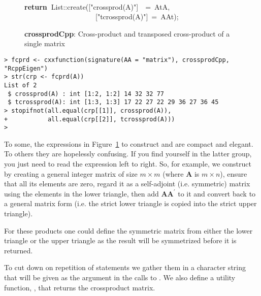 \documentclass[shortnames,article]{jss}
\newcommand{\hlstd}[1]{\textcolor[rgb]{0,0,0}{#1}}
\newcommand{\hlopt}[1]{\textcolor[rgb]{0,0,0}{#1}}
\newcommand{\hlstr}[1]{\textcolor[rgb]{0.90,0.15,0.15}{#1}}
\newcommand{\hlkwa}[1]{\textcolor[rgb]{0.61,0.13,0.93}{\bf{#1}}}
\newcommand{\hlkwd}[1]{\textcolor[rgb]{0,0,0}{#1}}
\begin{document}
\begin{figure}[htb]
    \hlstd{}\hspace*{\fill}\\
    \hlkwa{return\ }\hlstd{List}\hlopt{::}\hlstd{}\hlkwd{create}\hlstd{}\hlopt{(}\hlstd{\textunderscore }\hlopt{{[}}\hlstd{}\hlstr{"crossprod(A)"}\hlstd{}\hlopt{{]}}\hlstd{\ \ }\hlopt{=\ }\hlstd{AtA}\hlopt{,}\hspace*{\fill}\\
    \hlstd{}\hlstd{\ \ \ \ \ \ \ \ \ \ \ \ \ \ \ \ \ \ \ \ }\hlstd{\textunderscore }\hlopt{{[}}\hlstd{}\hlstr{"tcrossprod(A)"}\hlstd{}\hlopt{{]}\ =\ }\hlstd{AAt}\hlopt{);}\hlstd{}\hspace*{\fill}
    \normalfont
    \normalsize
  \caption{\textbf{crossprodCpp}: Cross-product and transposed cross-product of a single matrix}
  \label{crossprod}
\end{figure}
\begin{verbatim}
> fcprd <- cxxfunction(signature(AA = "matrix"), crossprodCpp, "RcppEigen")
> str(crp <- fcprd(A))
List of 2
 $ crossprod(A) : int [1:2, 1:2] 14 32 32 77
 $ tcrossprod(A): int [1:3, 1:3] 17 22 27 22 29 36 27 36 45
> stopifnot(all.equal(crp[[1]], crossprod(A)),
+           all.equal(crp[[2]], tcrossprod(A)))
> 
\end{verbatim}

To some, the expressions in Figure~\ref{crossprod} to construct
 and  are compact and elegant.  To others they are
hopelessly confusing.  If you find yourself in the latter group, you
just need to read the expression left to right.  So, for example, we
construct  by creating a general integer matrix of size
$m\times m$ (where $\bm A$ is $m\times n$), ensure that all its
elements are zero, regard it as a self-adjoint (i.e. symmetric) matrix
using the elements in the lower triangle, then add $\bm A\bm A^\prime$
to it and convert back to a general matrix form (i.e. the strict lower
triangle is copied into the strict upper triangle).

For these products one could define the symmetric matrix from either
the lower triangle or the upper triangle as the result will be
symmetrized before it is returned.

To cut down on repetition of  statements we gather them in
a character string that will be given as the  argument
in the calls to .  We also define a utility
function, , that returns the crossproduct matrix.
\end{document}
